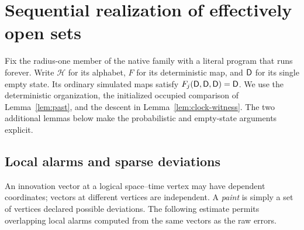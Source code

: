 \section{Sequential realization of effectively open sets}\label{sec:sequential}

Fix the radius-one member of the native family with a literal program that runs forever. Write \(\mathcal H\) for its alphabet, \(F\) for its deterministic map, and \(\mathsf D\) for its single empty state. Its ordinary simulated maps satisfy \(F_j(\mathsf D,\mathsf D,\mathsf D)=\mathsf D\). We use the deterministic organization, the initialized occupied comparison of Lemma~\ref{lem:past}, and the descent in Lemma~\ref{lem:clock-witness}. The two additional lemmas below make the probabilistic and empty-state arguments explicit.

\subsection{Local alarms and sparse deviations}

An innovation vector at a logical space--time vertex may have dependent coordinates; vectors at different vertices are independent. A \emph{paint} is simply a set of vertices declared possible deviations. The following estimate permits overlapping local alarms computed from the same vectors as the raw errors.


